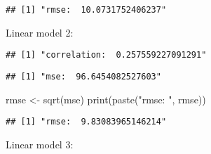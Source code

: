 \documentclass[
]{article}
\newenvironment{Shaded}{\begin{snugshade}}{\end{snugshade}}
\newcommand{\DecValTok}[1]{\textcolor[rgb]{0.00,0.00,0.81}{#1}}
\newcommand{\FunctionTok}[1]{\textcolor[rgb]{0.00,0.00,0.00}{#1}}
\newcommand{\NormalTok}[1]{#1}
\newcommand{\OtherTok}[1]{\textcolor[rgb]{0.56,0.35,0.01}{#1}}
\newcommand{\SpecialCharTok}[1]{\textcolor[rgb]{0.00,0.00,0.00}{#1}}
\newcommand{\StringTok}[1]{\textcolor[rgb]{0.31,0.60,0.02}{#1}}
\begin{document}
\begin{verbatim}
## [1] "rmse:  10.0731752406237"
\end{verbatim}

Linear model 2:

\begin{Shaded}
\end{Shaded}

\begin{verbatim}
## [1] "correlation:  0.257559227091291"
\end{verbatim}

\begin{Shaded}
\end{Shaded}

\begin{verbatim}
## [1] "mse:  96.6454082527603"
\end{verbatim}

\begin{Shaded}
\begin{Highlighting}[]
\NormalTok{rmse }\OtherTok{\textless{}{-}} \FunctionTok{sqrt}\NormalTok{(mse)}
\FunctionTok{print}\NormalTok{(}\FunctionTok{paste}\NormalTok{(}\StringTok{"rmse: "}\NormalTok{, rmse))}
\end{Highlighting}
\end{Shaded}

\begin{verbatim}
## [1] "rmse:  9.83083965146214"
\end{verbatim}

Linear model 3:

\begin{Shaded}
\end{Shaded}
\end{document}
